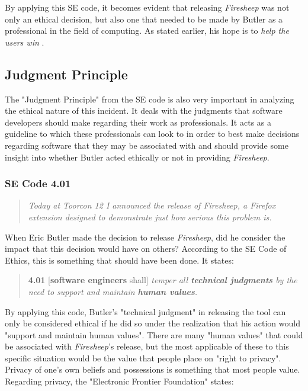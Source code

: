 \documentclass[11pt]{article}
\begin{document}
\begin{multicols}{2}
By applying this SE code, it becomes evident that releasing \emph{Firesheep} was not only an ethical decision, but also one that needed to be made by Butler as a professional in the field of computing. As stated earlier, his hope is to \emph{help the users win} \cite{codebutler_main}.

\subsection{Judgment Principle}
The "Judgment Principle" from the SE code is also very important in analyzing the ethical nature of this incident. It deals with the judgments that software developers should make regarding their work as professionals. It acts as a guideline to which these professionals can look to in order to best make decisions regarding software that they may be associated with and should provide some insight into whether Butler acted ethically or not in providing \emph{Firesheep}.

\subsubsection{SE Code 4.01}
\begin{quote}
  \emph{Today at Toorcon 12 I announced the release of Firesheep, a Firefox extension designed to demonstrate just how serious this problem is.} \cite{codebutler_main}
\end{quote}

When Eric Butler made the decision to release \emph{Firesheep}, did he consider the impact that this decision would have on others? According to the SE Code of Ethics, this is something that should have been done. It states:


\begin{quote}
\textbf{4.01} [\textbf{software engineers} shall] \emph{temper all \textbf{technical judgments} by the need to support and maintain \textbf{human values}.} \cite{se_code}
\end{quote}

By applying this code, Butler's "technical judgment" in releasing the tool can only be considered ethical if he did so under the realization that his action would "support and maintain human values". There are many "human values" that could be associated with \emph{Firesheep}'s release, but the most applicable of these to this specific situation would be the value that people place on "right to privacy". Privacy of one's own beliefs and possessions is something that most people value. Regarding privacy, the "Electronic Frontier Foundation" states:


\end{multicols}
\end{document}
